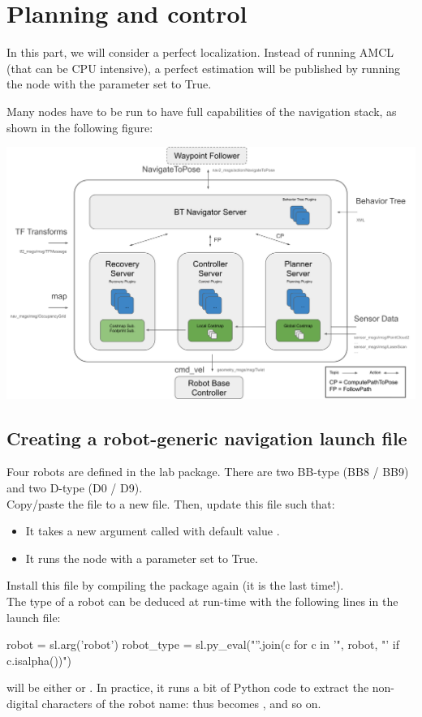 \documentclass{ecnreport}
\begin{document}
\section{Planning and control}

In this part, we will consider a perfect localization. Instead of running AMCL (that can be CPU intensive), a perfect estimation 
will be published by running the  node with the parameter  set to True.

Many nodes have to be run to have full capabilities of the navigation stack, as shown in the following figure:
\begin{center}
 \includegraphics[width=.7\linewidth]{nav2_architectural_diagram}
\end{center}

\subsection{Creating a robot-generic navigation launch file}

Four robots are defined in the lab package. There are two BB-type (BB8 / BB9) and two D-type (D0 / D9).\\

Copy/paste the  file to a new  file. Then, update this file such that:
\begin{itemize}
 \item It takes a new argument called  with default value .
 \item It runs the  node with a parameter  set to True. 
\end{itemize}

Install this file by compiling the package again (it is the last time!).\\

The type of a robot can be deduced at run-time with the following lines in the launch file:
\begin{pythoncodelarge}
robot = sl.arg('robot')
robot_type = sl.py_eval("''.join(c for c in '", robot, "' if c.isalpha())") 
\end{pythoncodelarge} will be either  or . In practice, it runs a bit of Python code to extract the non-digital characters of the robot name:  thus becomes , and so on.\\
\end{document}
